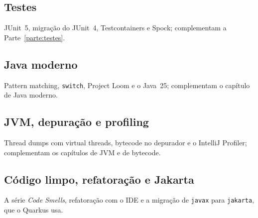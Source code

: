 \subsection{Testes}
JUnit~5, migração do JUnit~4, Testcontainers e Spock; complementam a
Parte~\ref{parte:testes}.

\subsection{Java moderno}
Pattern matching, \texttt{switch}, Project Loom e o Java~25; complementam
o capítulo de Java moderno.

\subsection{JVM, depuração e profiling}
Thread dumps com virtual threads, bytecode no depurador e o IntelliJ
Profiler; complementam os capítulos de JVM e de bytecode.

\subsection{Código limpo, refatoração e Jakarta}
A série \emph{Code Smells}, refatoração com o IDE e a migração de
\texttt{javax} para \texttt{jakarta}, que o Quarkus usa.
